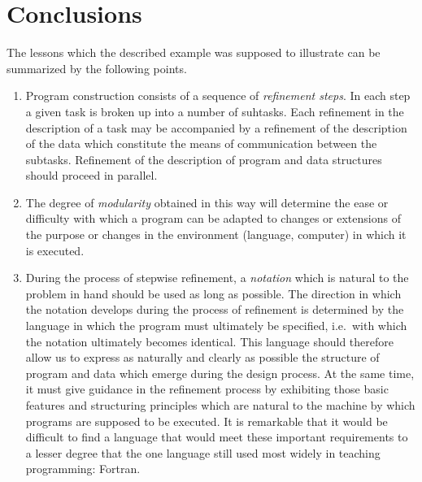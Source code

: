 \section{Conclusions}

The lessons which the described example was supposed to illustrate can be
summarized by the following points.

\begin{enumerate}
    \item Program construction consists of a sequence of \emph{refinement
          steps}.  In each step a given task is broken up into a number of
          suhtasks.  Each refinement in the description of a task may be
          accompanied by a refinement of the description of the data which
          constitute the means of communication between the subtasks.
          Refinement of the description of program and data structures should
          proceed in parallel.

    \item The degree of \emph{modularity} obtained in this way will determine
          the ease or difficulty with which a program can be adapted to changes
          or extensions of the purpose or changes in the environment (language,
          computer) in which it is executed.

    \item During the process of stepwise refinement, a \emph{notation} which is
          natural to the problem in hand should be used as long as possible.
          The direction in which the notation develops during the process of
          refinement is determined by the language in which the program must
          ultimately be specified, i.e.\ with which the notation ultimately
          becomes identical.  This language should therefore allow us to express
          as naturally and clearly as possible the structure of program and
          data which emerge during the design process. At the same time, it
          must give guidance in the refinement process by exhibiting those
          basic features and structuring principles which are natural to the
          machine by which programs are supposed to be executed.  It is
          remarkable that it would be difficult to find a language that would
          meet these important requirements to a lesser degree that the one
          language still used most widely in teaching programming: Fortran.


\end{enumerate}
